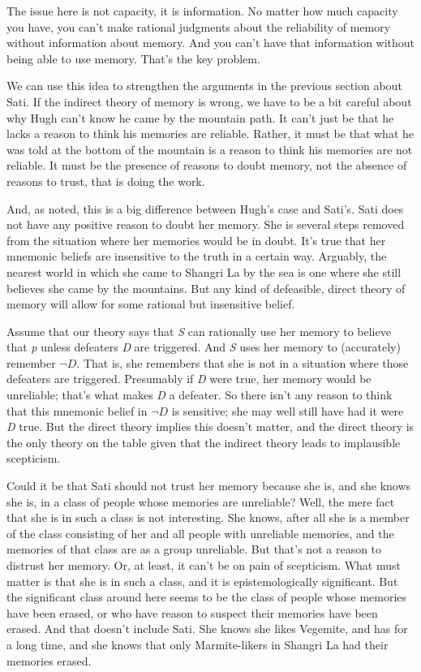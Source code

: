 The issue here is not capacity, it is information. No matter how much capacity you have, you can't make rational judgments about the reliability of memory without information about memory. And you can't have that information without being able to use memory. That's the key problem.

We can use this idea to strengthen the arguments in the previous section about Sati. If the indirect theory of memory is wrong, we have to be a bit careful about why Hugh can't know he came by the mountain path. It can't just be that he lacks a reason to think his memories are reliable. Rather, it must be that what he was told at the bottom of the mountain is a reason to think his memories are not reliable. It must be the presence of reasons to doubt memory, not the absence of reasons to trust, that is doing the work.

And, as noted, this is a big difference between Hugh's case and Sati's. Sati does not have any positive reason to doubt her memory. She is several steps removed from the situation where her memories would be in doubt. It's true that her mnemonic beliefs are insensitive to the truth in a certain way. Arguably, the nearest world in which she came to Shangri La by the sea is one where she still believes she came by the mountains. But any kind of defeasible, direct theory of memory will allow for some rational but insensitive belief.

Assume that our theory says that \emph{S} can rationally use her memory to believe that \emph{p} unless defeaters \emph{D} are triggered. And \emph{S} uses her memory to (accurately) remember $\neg D$. That is, she remembers that she is not in a situation where those defeaters are triggered. Presumably if \emph{D} were true, her memory would be unreliable; that's what makes \emph{D} a defeater. So there isn't any reason to think that this mnemonic belief in $\neg D$ is sensitive; she may well still have had it were \emph{D} true. But the direct theory implies this doesn't matter, and the direct theory is the only theory on the table given that the indirect theory leads to implausible scepticism.

Could it be that Sati should not trust her memory because she is, and she knows she is, in a class of people whose memories are unreliable? Well, the mere fact that she is in such a class is not interesting. She knows, after all she is a member of the class consisting of her and all people with unreliable memories, and the memories of that class are as a group unreliable. But that's not a reason to distrust her memory. Or, at least, it can't be on pain of scepticism. What must matter is that she is in such a class, and it is epistemologically significant. But the significant class around here seems to be the class of people whose memories have been erased, or who have reason to suspect their memories have been erased. And that doesn't include Sati. She knows she likes Vegemite, and has for a long time, and she knows that only Marmite-likers in Shangri La had their memories erased.


